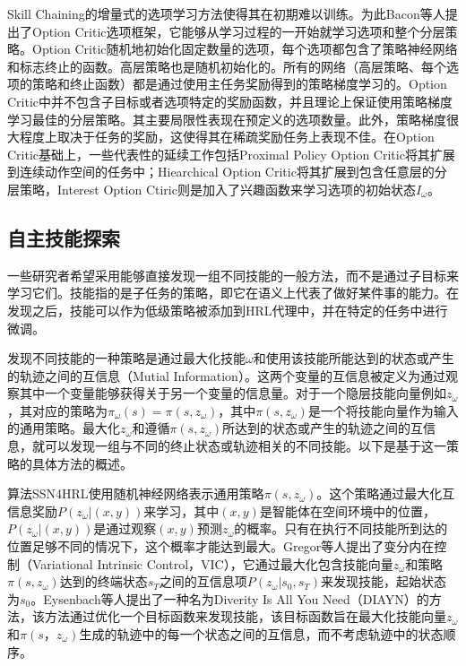 Skill Chaining的增量式的选项学习方法使得其在初期难以训练。为此Bacon等人\cite{bacon2017option}提出了Option Critic选项框架，它能够从学习过程的一开始就学习选项和整个分层策略。Option Critic随机地初始化固定数量的选项，每个选项都包含了策略神经网络和标志终止的函数。高层策略也是随机初始化的。所有的网络（高层策略、每个选项的策略和终止函数）都是通过使用主任务奖励得到的策略梯度学习的。Option Critic中并不包含子目标或者选项特定的奖励函数，并且理论上保证使用策略梯度学习最佳的分层策略。其主要局限性表现在预定义的选项数量。此外，策略梯度很大程度上取决于任务的奖励，这使得其在稀疏奖励任务上表现不佳。在Option Critic基础上，一些代表性的延续工作包括Proximal Policy Option Critic\cite{klissarov2017learnings}将其扩展到连续动作空间的任务中；Hiearchical Option Critic\cite{riemer2018learning}将其扩展到包含任意层的分层策略，Interest Option Ctiric\cite{khetarpal2019learning}则是加入了兴趣函数来学习选项的初始状态$I_\omega$。

\subsection{自主技能探索}

一些研究者希望采用能够直接发现一组不同技能的一般方法，而不是通过子目标来学习它们。技能指的是子任务的策略，即它在语义上代表了做好某件事的能力。在发现之后，技能可以作为低级策略被添加到HRL代理中，并在特定的任务中进行微调。

发现不同技能的一种策略是通过最大化技能$\omega$和使用该技能所能达到的状态或产生的轨迹之间的互信息（Mutial Information）。这两个变量的互信息被定义为通过观察其中一个变量能够获得关于另一个变量的信息量。对于一个隐层技能向量例如$z_\omega$，其对应的策略为$\pi_\omega(s)=\pi(s,z_\omega)$，其中$\pi(s,z_\omega)$是一个将技能向量作为输入的通用策略。最大化$z_\omega$和遵循$\pi(s,z_\omega)$所达到的状态或产生的轨迹之间的互信息，就可以发现一组与不同的终止状态或轨迹相关的不同技能。以下是基于这一策略的具体方法的概述。

算法SSN4HRL\cite{florensa2017stochastic}使用随机神经网络表示通用策略$\pi(s,z_\omega)$。这个策略通过最大化互信息奖励$P(z_\omega|(x,y))$来学习，其中$(x,y)$是智能体在空间环境中的位置，$P(z_\omega|(x,y))$是通过观察$(x,y)$预测$z_\omega$的概率。只有在执行不同技能所到达的位置足够不同的情况下，这个概率才能达到最大。Gregor等人\cite{gregor2016variational}提出了变分内在控制（Variational Intrinsic Control，VIC），它通过最大化包含技能向量$z_\omega$和策略$\pi(s,z_\omega)$达到的终端状态$s_T$之间的互信息项$P(z_\omega|s_0,s_T)$来发现技能，起始状态为$s_0$。Eysenbach等人\cite{eysenbach2018diversity}提出了一种名为Diverity Is All You Need（DIAYN）的方法，该方法通过优化一个目标函数来发现技能，该目标函数旨在最大化技能向量$z_\omega$和$\pi(s，z_\omega)$生成的轨迹中的每一个状态之间的互信息，而不考虑轨迹中的状态顺序。

